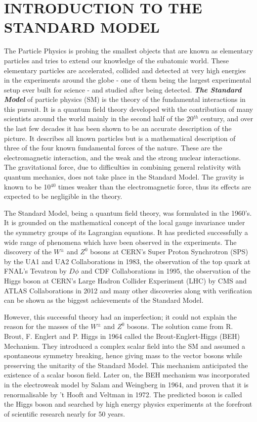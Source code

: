 \chapter{INTRODUCTION TO THE STANDARD MODEL}\label{Ch1}

The Particle Physics is probing the smallest objects that are known as elementary particles and tries to extend our knowledge of the subatomic world. These elementary particles are accelerated, collided and detected at very high energies in the experiments around the globe - one of them being the largest experimental setup ever built for science - and studied after being detected. \textbf{\textit{The Standard Model}} of particle physics (SM) is the theory of the fundamental interactions in this pursuit. It is a quantum field theory developed with the contribution of many scientists around the world mainly in the second half of the 20$^{th}$ century, and over the last few decades it has been shown to be an accurate description of the picture. It describes all known particles but is a mathematical description of three of the four known fundamental forces of the nature. These are the electromagnetic interaction, and the weak and the strong nuclear interactions. The gravitational force, due to difficulties in combining general relativity with quantum mechanics, does not take place in the Standard Model. The gravity is known to be 10$^{40}$ times weaker than the electromagnetic force, thus its effects are expected to be negligible in the theory.

The Standard Model, being a quantum field theory, was formulated in the 1960's. It is grounded on the mathematical concept of the local gauge invariance under the symmetry groups of its Lagrangian equations. It has predicted successfully a wide range of phenomena which have been observed in the experiments. The discovery of the $W^\pm$ and $Z^0$ bosons at CERN's Super Proton Synchrotron (SPS) by the UA1 and UA2 Collaborations in 1983\cite{SPS-1, SPS-2, SPS-3, SPS-4, SPS-5}, the observation of the top quark at FNAL's Tevatron by $D\phi$ and CDF Collaborations in 1995\cite{fnal-1, fnal-2}, the observation of the Higgs boson at CERN's Large Hadron Collider Experiment (LHC) by CMS and ATLAS Collaborations in 2012\cite{HiggsCMS,HiggsATLAS} and many other discoveries along with verification can be shown as the biggest achievements of the Standard Model.

However, this successful theory had an imperfection; it could not explain the reason for the masses of the $W^\pm$ and $Z^0$ bosons. The solution came from R. Brout, F. Englert and P. Higgs in 1964 called the Brout-Englert-Higgs (BEH) Mechanism\cite{Higgs1964, BroutEnglert, Guralnik1964}. They introduced a complex scalar field into the SM and assumed a spontaneous symmetry breaking, hence giving mass to the vector bosons while preserving the unitarity of the Standard Model. This mechanism anticipated the existence of a scalar boson field. Later on, the BEH mechanism was incorporated in the electroweak model by Salam and Weingberg in 1964\cite{salam}, and proven that it is renormalisable by 't Hooft and Veltman in 1972\cite{thooft}. The predicted boson is called the Higgs boson and searched by high energy physics experiments at the forefront of scientific research nearly for 50 years.

